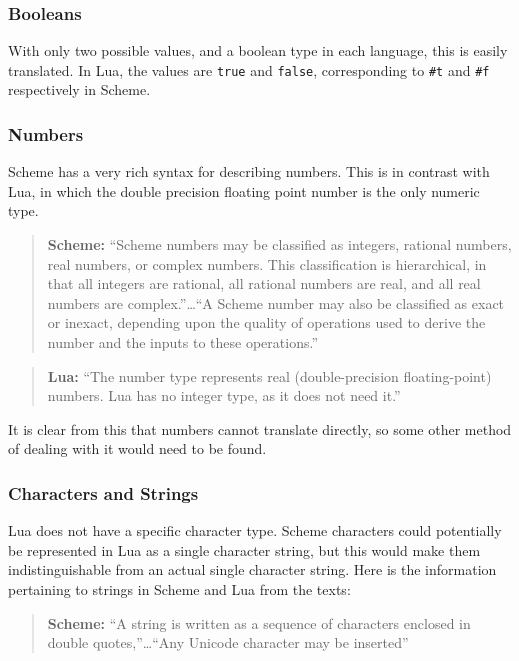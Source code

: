 \subsubsection{Booleans}

With only two possible values, and a boolean type in each language, this is
easily translated. In Lua, the values are \texttt{true} and \texttt{false},
corresponding to \texttt{\#t} and \texttt{\#f} respectively in Scheme.

\subsubsection{Numbers}

Scheme has a very rich syntax for describing numbers. This is in contrast with
Lua, in which the double precision floating point number is the only
numeric type.

\begin{quotation}\textbf{Scheme:}
``Scheme numbers may be classified as integers, rational numbers, real numbers,
or complex numbers. This classification is hierarchical, in that all integers
are rational, all rational numbers are real, and all real numbers are
complex.''\ldots ``A Scheme number may also be classified as exact or inexact,
depending upon the quality of operations used to derive the number and the
inputs to these operations.''~\cite[Sec~6.4]{tspl}
\end{quotation}

\begin{quotation}\textbf{Lua:}
``The number type represents real (double-precision floating-point) numbers. Lua
has no integer type, as it does not need it.''~\cite[p.10]{luabook}
\end{quotation}

It is clear from this that numbers cannot translate directly, so some other
method of dealing with it would need to be found.

\subsubsection{Characters and Strings}

Lua does not have a specific character type. Scheme characters could potentially
be represented in Lua as a single character string, but this would make them
indistinguishable from an actual single character string. Here is the
information pertaining to strings in Scheme and Lua from the texts:

\begin{quotation}\textbf{Scheme:}
``A string is written as a sequence of characters enclosed in double
quotes,''\ldots ``Any Unicode character may be inserted''~\cite[Sec~6.8]{tspl}
\end{quotation}

